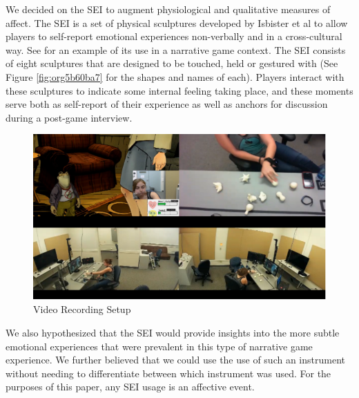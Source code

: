 We decided on the SEI to augment physiological and qualitative
measures of affect. The SEI is a set of physical sculptures developed
by Isbister et al to allow players to self-report emotional
experiences non-verbally and in a cross-cultural way. See
\cite{Laaksolahti2009-uw} for an example of its use in a narrative
game context. The SEI consists of eight sculptures that are designed
to be touched, held or gestured with (See Figure \ref{fig:org5b60ba7} for
the shapes and names of each). Players interact with these sculptures
to indicate some internal feeling taking place, and these moments
serve both as self-report of their experience as well as anchors for
discussion during a post-game interview.

\begin{figure}[htbp]
\centering
\includegraphics[width=.9\linewidth]{figures/fig1.PNG}
\caption{\label{fig:org35e2737}
Video Recording Setup}
\end{figure}

We also hypothesized that the SEI would provide insights into the more
subtle emotional experiences that were prevalent in this type of
narrative game experience. We further believed that we could use the
use of such an instrument without needing to differentiate between
which instrument was used. For the purposes of this paper, any SEI
usage is an affective event.

